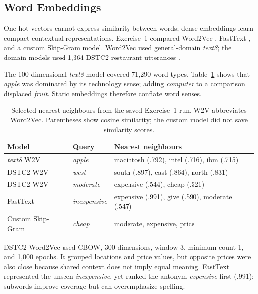 \documentclass[11pt]{article}
\begin{document}
\subsection{Word Embeddings}
One-hot vectors cannot express similarity between words; dense embeddings
learn compact contextual representations. Exercise~1 compared Word2Vec
\citep{mikolov-etal-2013-distributed}, FastText
\citep{bojanowski-etal-2017-enriching}, and a custom Skip-Gram model. Word2Vec
used general-domain \textit{text8}; the domain models used 1,364 DSTC2
restaurant utterances \citep{henderson-etal-2014-second}.

The 100-dimensional \textit{text8} model covered 71,290 word types.
Table~\ref{tab:word-embedding-results} shows that \textit{apple} was dominated
by its technology sense; adding \textit{computer} to a comparison displaced
\textit{fruit}. Static embeddings therefore conflate word senses.

\begin{table}[H]
  \centering
  \small
  \begin{tabular}{@{}
    >{\raggedright\arraybackslash}p{}
    >{\raggedright\arraybackslash}p{}
    >{\raggedright\arraybackslash}p{}@{}}
    \toprule
    \textbf{Model} & \textbf{Query} & \textbf{Nearest neighbours} \\
    \midrule
    \textit{text8} W2V & \textit{apple} & macintosh (.792), intel (.716), ibm (.715) \\
    \addlinespace[2pt]
    DSTC2 W2V & \textit{west} & south (.897), east (.864), north (.831) \\
    \addlinespace[2pt]
    DSTC2 W2V & \textit{moderate} & expensive (.544), cheap (.521) \\
    \addlinespace[2pt]
    FastText & \textit{inexpensive} & expensive (.991), give (.590), moderate (.547) \\
    \addlinespace[2pt]
    Custom Skip-Gram & \textit{cheap} & moderate, expensive, price \\
    \bottomrule
  \end{tabular}
  \caption{Selected nearest neighbours from the saved Exercise~1 run. W2V
  abbreviates Word2Vec. Parentheses show cosine similarity; the custom model
  did not save similarity scores.}
  \label{tab:word-embedding-results}
\end{table}

DSTC2 Word2Vec used CBOW, 300 dimensions, window 3, minimum count 1, and 1,000
epochs. It grouped locations and price values, but opposite prices were also
close because shared context does not imply equal meaning. FastText represented
the unseen \textit{inexpensive}, yet ranked the antonym \textit{expensive}
first (.991); subwords improve coverage but can overemphasize spelling.
\end{document}
